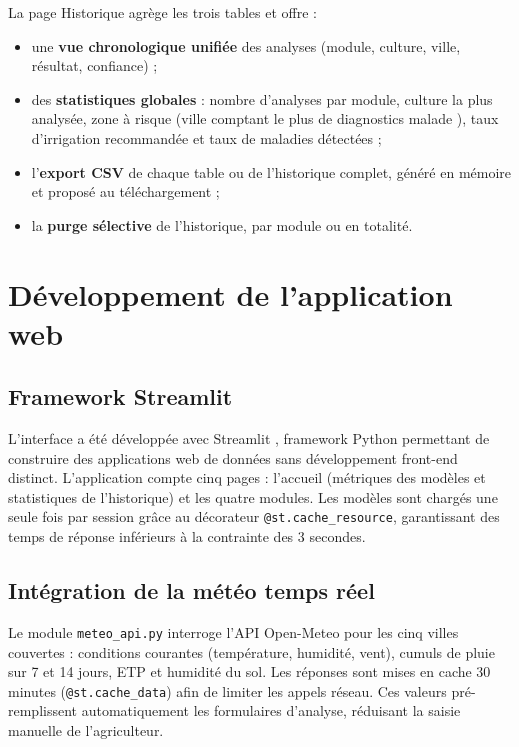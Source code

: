 La page Historique agrège les trois tables et offre :

\begin{itemize}[leftmargin=1.2cm]
	\item une \textbf{vue chronologique unifiée} des analyses
	(module, culture, ville, résultat, confiance) ;
	\item des \textbf{statistiques globales} : nombre d'analyses
	par module, culture la plus analysée, zone à risque
	(ville comptant le plus de diagnostics \og malade \fg),
	taux d'irrigation recommandée et taux de maladies
	détectées ;
	\item l'\textbf{export CSV} de chaque table ou de l'historique
	complet, généré en mémoire et proposé au téléchargement ;
	\item la \textbf{purge sélective} de l'historique, par module
	ou en totalité.
\end{itemize}

\section{Développement de l'application web}
\label{sec:appli_web}

\subsection{Framework Streamlit}

L'interface a été développée avec Streamlit \cite{streamlit2024},
framework Python permettant de construire des applications web de
données sans développement front-end distinct. L'application
compte cinq pages : l'accueil (métriques des modèles et
statistiques de l'historique) et les quatre modules. Les modèles
sont chargés une seule fois par session grâce au décorateur
\texttt{@st.cache\_resource}, garantissant des temps de réponse
inférieurs à la contrainte des 3 secondes.

\subsection{Intégration de la météo temps réel}

Le module \texttt{meteo\_api.py} interroge l'API Open-Meteo
\cite{zippenfenig2023openmeteo} pour les cinq villes couvertes :
conditions courantes (température, humidité, vent), cumuls de
pluie sur 7 et 14 jours, ETP et humidité du sol. Les réponses
sont mises en cache 30 minutes (\texttt{@st.cache\_data}) afin de
limiter les appels réseau. Ces valeurs pré-remplissent
automatiquement les formulaires d'analyse, réduisant la saisie
manuelle de l'agriculteur.

